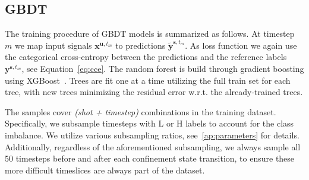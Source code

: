 \subsection{GBDT}
The training procedure of GBDT models is summarized as follows. At timestep $m$ we map input signals $\mathbf{x}^{\mathbf{u},t_m}$ to predictions $\mathbf{\widetilde{y}}^{\mathbf{s},t_m}$. As loss function we again use the categorical cross-entropy between the predictions and the reference labels $\mathbf{y}^{\mathbf{s},t_m}$, see Equation~\ref{eq:cce}. The random forest is build through gradient boosting using XGBoost~\cite{xgboost2016}. Trees are fit one at a time utilizing the full train set for each tree, with new trees minimizing the residual error w.r.t. the already-trained trees.

The samples cover \textit{(shot + timestep)} combinations in the training dataset. Specifically, we subsample timesteps with L or H labels to account for the class imbalance. We utilize various subsampling ratios, see~\ref{ap:parameters} for details. Additionally, regardless of the aforementioned subsampling, we always sample all 50 timesteps before and after each confinement state transition, to ensure these more difficult timeslices are always part of the dataset.
